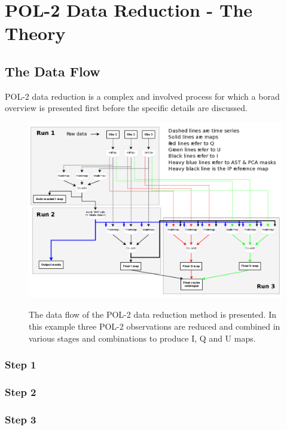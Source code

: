 \chapter{POL-2 Data Reduction - The Theory}
\label{sec:dr}
\section{The Data Flow}

POL-2 data reduction is a complex and involved process
for which a borad overview is presented first before
the specific details are discussed.



\begin{figure}[t!]
\begin{center}
\includegraphics[width=0.95\linewidth]{pol2-dr-flow.png}
\label{fig:pol2drflow}
\caption [POL-2 Data Flow]{
  \small The data flow of the POL-2 data reduction method is
  presented. In this example three POL-2 observations are
  reduced and combined in various stages and combinations to
  produce I, Q and U maps.
}
\end{center}
\end{figure}

\subsection*{Step 1}

\subsection*{Step 2}

\subsection*{Step 3}



